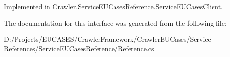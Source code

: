 Implemented in \hyperlink{class_crawler_1_1_service_e_u_cases_reference_1_1_service_e_u_cases_client_ad9c02be4556618c516a9f4c87c11fc60}{Crawler.\-Service\-E\-U\-Cases\-Reference.\-Service\-E\-U\-Cases\-Client}.



The documentation for this interface was generated from the following file\-:\begin{DoxyCompactItemize}
\item 
D\-:/\-Projects/\-E\-U\-C\-A\-S\-E\-S/\-Crawler\-Framework/\-Crawler\-E\-U\-Cases/\-Service References/\-Service\-E\-U\-Cases\-Reference/\hyperlink{_reference_8cs}{Reference.\-cs}\end{DoxyCompactItemize}
